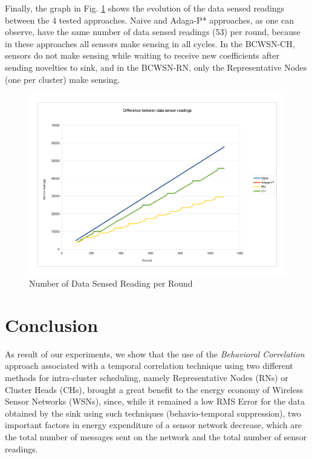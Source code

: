 \documentclass[conference]{IEEEtran}
\begin{document}

Finally, the graph in Fig. \ref{fig:sens-reading} shows the evolution of
the data sensed readings between the 4 tested approaches.
Naive and Adaga-P* approaches, as one can observe, have the same number of data
sensed readings (53) per round, because in these approaches all sensors
make sensing in all cycles. In the BCWSN-CH, sensors do not make sensing while
waiting to receive new coefficients after sending novelties to sink, and in the
BCWSN-RN, only the Representative Nodes (one per cluster) make sensing.

\begin{figure}[!htb]
\centering
	\includegraphics[scale=0.085]{graf_SREAD_.png}
    \caption{Number of Data Sensed Reading per Round}
    \label{fig:sens-reading}
\end{figure}


\section{Conclusion}
\label{conclusion}

As result of our experiments, we show that the use of the \textit{Behavioral
Correlation} approach associated with a temporal correlation technique using two
different methods for intra-cluster scheduling, namely Representative Nodes
(RNs) or Cluster Heads (CHs), brought a great benefit to the energy economy of
Wireless Sensor Networks (WSNs), since, while it remained a low RMS Error for
the data obtained by the sink using such techniques (behavio-temporal
suppression), two important factors in energy expenditure of a sensor network
decrease, which are the total number of messages sent on the network and the
total number of sensor readings.
\end{document}
